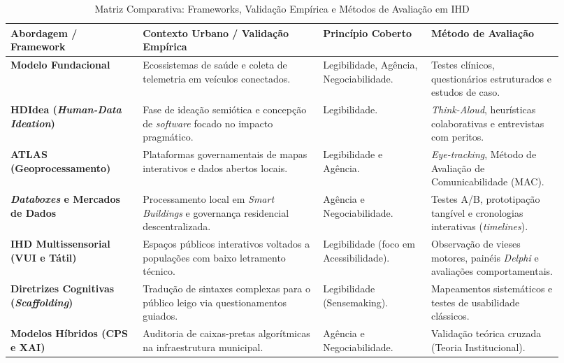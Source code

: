 \documentclass[12pt]{article}
\begin{document}
\begin{table}[H] %
\centering
\caption{Matriz Comparativa: Frameworks, Validação Empírica e Métodos de Avaliação em IHD}
\label{tab:matriz_frameworks}
\scriptsize
\renewcommand{\arraystretch}{1.0}
\setlength{\tabcolsep}{3pt}
\begin{tabular}{
  >{\raggedright\arraybackslash}p{0.22\linewidth}
  >{\raggedright\arraybackslash}p{0.30\linewidth}
  >{\raggedright\arraybackslash}p{0.18\linewidth}
  >{\raggedright\arraybackslash}p{0.22\linewidth}
}
\toprule
\textbf{Abordagem / Framework} & \textbf{Contexto Urbano / Validação Empírica} & \textbf{Princípio Coberto} & \textbf{Método de Avaliação} \\ \midrule
\textbf{Modelo Fundacional \cite{mortier2015humandatainteractionhumanface}} & Ecossistemas de saúde e coleta de telemetria em veículos conectados. & Legibilidade, Agência, Negociabilidade. & Testes clínicos, questionários estruturados e estudos de caso. \\
\textbf{HDIdea (\textit{Human-Data Ideation}) \cite{Strey2019Human}} & Fase de ideação semiótica e concepção de \textit{software} focado no impacto pragmático. & Legibilidade. & \textit{Think-Aloud}, heurísticas colaborativas e entrevistas com peritos. \\
\textbf{ATLAS (Geoprocessamento) \cite{Capeleti2024Human}} & Plataformas governamentais de mapas interativos e dados abertos locais. & Legibilidade e Agência. & \textit{Eye-tracking}, Método de Avaliação de Comunicabilidade (MAC). \\
\textbf{\textit{Databoxes} e Mercados de Dados \cite{Crabtree2016}} & Processamento local em \textit{Smart Buildings} e governança residencial descentralizada. & Agência e Negociabilidade. & Testes A/B, prototipação tangível e cronologias interativas (\textit{timelines}). \\
\textbf{IHD Multissensorial (VUI e Tátil) \cite{Sailaja2021, Friedman2024, Crabtree2016}} & Espaços públicos interativos voltados a populações com baixo letramento técnico. & Legibilidade (foco em Acessibilidade). & Observação de vieses motores, painéis \textit{Delphi} e avaliações comportamentais. \\
\textbf{Diretrizes Cognitivas (\textit{Scaffolding}) \cite{Trajkova2020}} & Tradução de sintaxes complexas para o público leigo via questionamentos guiados. & Legibilidade (Sensemaking). & Mapeamentos sistemáticos e testes de usabilidade clássicos. \\
\textbf{Modelos Híbridos (CPS e XAI) \cite{bavaresco2019technological, durango2024data}} & Auditoria de caixas-pretas algorítmicas na infraestrutura municipal. & Agência e Negociabilidade. & Validação teórica cruzada (Teoria Institucional). \\ \bottomrule
\end{tabular}
\end{table}
\end{document}
